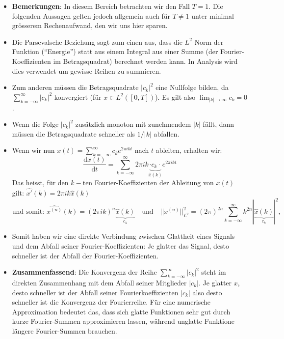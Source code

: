 \documentclass[11pt]{article}
\begin{document}
    \begin{itemize}[leftmargin=0pt]
        \item[] \textbf{Bemerkungen}: In diesem Bereich betrachten wir den Fall $T=1$. Die folgenden Aussagen gelten jedoch allgemein auch für $T\neq 1$ unter minimal grösserem Rechenaufwand, den wir uns hier sparen.
        \item[] Die Parsevalsche Beziehung sagt zum einen aus, dass die $L^2$-Norm der Funktion (“Energie”) statt aus einem Integral aus einer Summe (der Fourier-Koeffizienten im Betragsquadrat) berechnet werden kann. In Analysis wird dies verwendet um gewisse Reihen zu summieren.
        \item[] Zum anderen müssen die Betragsquadrate $|c_k|^2$ eine Nullfolge bilden, da $\sum_{k=-\infty}^\infty |c_k|^2$ konvergiert (für $x \in L^2([0,T])$). Es gilt also $\lim_{|k|\to \infty} c_k = 0$.
        \item[] Wenn die Folge $|c_k|^2$ zusätzlich monoton mit zunehmendem $|k|$ fällt, dann müssen die Betragsquadrate schneller als $1/|k|$ abfallen.
        \item[] Wenn wir nun $x(t) = \sum_{k = -\infty}^\infty c_k e^{2 \pi i k t}$ nach $t$ ableiten, erhalten wir:
        $$\frac{\text{d}x(t)}{\text{d}t} = \sum_{k=-\infty}^{\infty} 2 \pi i k \underbrace{\cdot c_k \cdot}_{\hat{x}(k)} e^{2 \pi i k t}$$
        Das heisst, für den $k-$ten Fourier-Koeffizienten der Ableitung von $x(t)$ gilt: $\hat{x'}(k) = 2 \pi i k \hat{x}(k)$ 
        $$\text{und somit: }\widehat{x^{(n)}}(k) = (2 \pi i k)^n \underbrace{\hat{x}(k)}_{c_k} \hspace{12pt} \text{und} \hspace{12pt} ||x^{(n)}||^2_{L^2} = (2 \pi)^{2n} \sum_{k = -\infty}^\infty k^{2n}|\underbrace{\hat{x}(k)}_{c_k}|^2,$$
        \item[] Somit haben wir eine direkte Verbindung zwischen Glattheit eines Signals und dem Abfall seiner Fourier-Koeffizienten: Je glatter das Signal, desto schneller ist der Abfall der Fourier-Koeffizienten.
        \item[] \textbf{Zusammenfassend}: Die Konvergenz der Reihe $\sum_{k=-\infty}^\infty |c_k|^2$ steht im direkten Zusammenhang mit dem Abfall seiner Mitglieder $|c_k|$. Je glatter $x$, desto schneller ist der Abfall seiner Fourierkoeffizienten $|c_k|$ also desto schneller ist die Konvergenz der Fourierreihe. Für eine numerische Approximation bedeutet das, dass sich glatte Funktionen sehr gut durch kurze Fourier-Summen approximieren lassen, während unglatte Funktione längere Fourier-Summen brauchen.
    \end{itemize}
\end{document}
